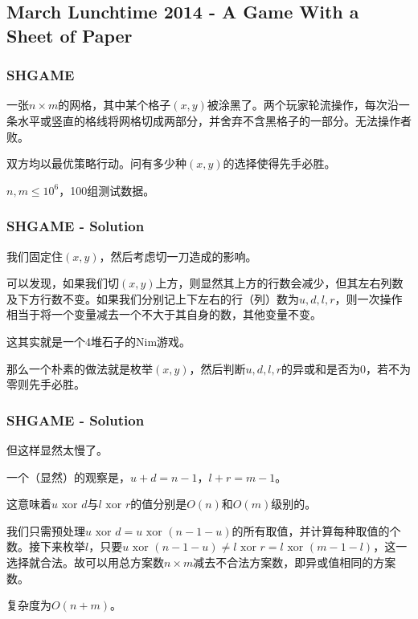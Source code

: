 \documentclass[11pt,dvipsnames,table]{beamer}
\begin{document}
{
	
	\subsection{March Lunchtime 2014 - A Game With a Sheet of Paper}
	\begin{frame}
		\frametitle{SHGAME}
		一张$n\times m$的网格，其中某个格子$(x,y)$被涂黑了。两个玩家轮流操作，每次沿一条水平或竖直的格线将网格切成两部分，并舍弃不含黑格子的一部分。无法操作者败。
		
		双方均以最优策略行动。问有多少种$(x,y)$的选择使得先手必胜。
		
		$n,m\leq 10^6$，100组测试数据。
	\end{frame}
	\begin{frame}
		\frametitle{SHGAME - Solution}
		我们固定住$(x,y)$，然后考虑切一刀造成的影响。 \pause
		
		可以发现，如果我们切$(x,y)$上方，则显然其上方的行数会减少，但其左右列数及下方行数不变。如果我们分别记上下左右的行（列）数为$u,d,l,r$，则一次操作相当于将一个变量减去一个不大于其自身的数，其他变量不变。
		
		这其实就是一个4堆石子的Nim游戏。 \pause
		
		那么一个朴素的做法就是枚举$(x,y)$，然后判断$u,d,l,r$的异或和是否为0，若不为零则先手必胜。
	\end{frame}
	\begin{frame}
		\frametitle{SHGAME - Solution}
		但这样显然太慢了。
		
		一个（显然）的观察是，$u+d=n-1$，$l+r=m-1$。 \pause
		
		这意味着$u\textrm{ xor }d$与$l\textrm{ xor }r$的值分别是$O(n)$和$O(m)$级别的。 \pause
		
		我们只需预处理$u\textrm{ xor }d=u\textrm{ xor }(n-1-u)$的所有取值，并计算每种取值的个数。接下来枚举$l$，只要$u\textrm{ xor }(n-1-u)\neq l\textrm{ xor }r=l\textrm{ xor }(m-1-l)$，这一选择就合法。故可以用总方案数$n\times m$减去不合法方案数，即异或值相同的方案数。
		
		复杂度为$O(n+m)$。
	\end{frame}
	
}
\end{document}
